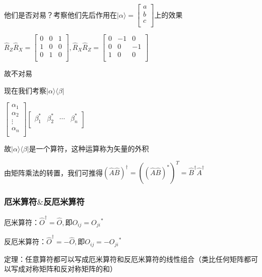\documentclass[lang=cn,10pt]{elegantbook}
\begin{document}
他们是否对易？考察他们先后作用在$|\alpha\rangle=\left[ \begin{array}{c}
	a\\
	b\\
	c\\
\end{array} \right] $上的效果

$\hat{R}_Z\hat{R}_X=\left[ \begin{matrix}
	0&		0&		1\\
	1&		0&		0\\
	0&		1&		0\\
\end{matrix} \right] ,\hat{R}_X\hat{R}_Z=\left[ \begin{matrix}
	0&		-1&		0\\
	0&		0&		-1\\
	1&		0&		0\\
\end{matrix} \right] $

故不对易

现在我们考察$|\alpha \rangle \langle \beta |$

$\left[ \begin{array}{c}
	\alpha _1\\
	\alpha _2\\
	\vdots\\
	\alpha _n\\
	\end{array} \right] \left[ \begin{matrix}
		\beta _{1}^{*}&		\beta _{2}^{*}&		\cdots&		\beta _{n}^{*}\\
	\end{matrix} \right] $

故$|\alpha \rangle \langle \beta |$是一个算符，这种运算称为矢量的外积

由矩阵乘法的转置，我们可推得$\left( \hat{A}\hat{B} \right) ^{\dagger}=\left( \left( \hat{A}\hat{B} \right) ^* \right) ^T=\hat{B}^{\dagger}\hat{A}^{\dagger}
$
\subsubsection{厄米算符\texorpdfstring{$\&$}{和}反厄米算符}

厄米算符：$\hat{O}^{\dagger}=\hat{O},\text{即}O_{ij}={O_{ji}}^*
$

反厄米算符：$\hat{O}^{\dagger}=-\hat{O},\text{即}O_{ij}=-{O_{ji}}^*$

定理：任意算符都可以写成厄米算符和反厄米算符的线性组合（类比任何矩阵都可以写成对称矩阵和反对称矩阵的和）
\end{document}
